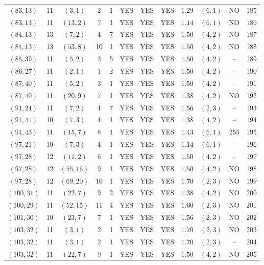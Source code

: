 \begin{longtable}{|c|c|c|c|c|c|c|c|c|c|c|c|}
$(83,13)$ & 11 & $(3,1)$ & 2 & 1 & YES & YES & YES & $1.29$ & $(6,1)$ & NO & 185\\
$(83,13)$ & 11 & $(13,2)$ & 7 & 1 & YES & YES & YES & $1.14$ & $(6,1)$ & NO & 186\\
$(84,13)$ & 13 & $(7,2)$ & 4 & 7 & YES & YES & YES & $1.50$ & $(4,2)$ & NO & 187\\
$(84,13)$ & 13 & $(53,8)$ & 10 & 1 & YES & YES & YES & $1.50$ & $(4,2)$ & NO & 188\\
$(85,39)$ & 11 & $(5,2)$ & 3 & 5 & YES & YES & YES & $1.50$ & $(4,2)$ & -- & 189\\
$(86,27)$ & 11 & $(2,1)$ & 1 & 2 & YES & YES & YES & $1.50$ & $(4,2)$ & -- & 190\\
$(87,40)$ & 11 & $(5,2)$ & 3 & 1 & YES & YES & YES & $1.50$ & $(4,2)$ & -- & 191\\
$(87,40)$ & 11 & $(20,9)$ & 7 & 1 & YES & YES & YES & $1.38$ & $(4,2)$ & NO & 192\\
$(91,24)$ & 11 & $(7,2)$ & 4 & 7 & YES & YES & YES & $1.56$ & $(2,3)$ & -- & 193\\
$(94,41)$ & 10 & $(7,3)$ & 4 & 1 & YES & YES & YES & $1.38$ & $(4,2)$ & -- & 194\\
$(94,43)$ & 11 & $(15,7)$ & 8 & 1 & YES & YES & YES & $1.43$ & $(6,1)$ & 255 & 195\\
$(97,21)$ & 10 & $(7,3)$ & 4 & 1 & YES & YES & YES & $1.14$ & $(6,1)$ & -- & 196\\
$(97,28)$ & 12 & $(11,2)$ & 6 & 1 & YES & YES & YES & $1.50$ & $(4,2)$ & -- & 197\\
$(97,28)$ & 12 & $(55,16)$ & 9 & 1 & YES & YES & YES & $1.50$ & $(4,2)$ & NO & 198\\
$(97,28)$ & 12 & $(69,20)$ & 10 & 1 & YES & YES & YES & $1.70$ & $(2,3)$ & NO & 199\\
$(100,31)$ & 11 & $(22,7)$ & 9 & 2 & YES & YES & YES & $1.38$ & $(4,2)$ & NO & 200\\
$(100,29)$ & 11 & $(52,15)$ & 11 & 4 & YES & YES & YES & $1.60$ & $(2,3)$ & NO & 201\\
$(101,30)$ & 10 & $(23,7)$ & 7 & 1 & YES & YES & YES & $1.56$ & $(2,3)$ & NO & 202\\
$(103,32)$ & 11 & $(3,1)$ & 2 & 1 & YES & YES & YES & $1.70$ & $(2,3)$ & NO & 203\\
$(103,32)$ & 11 & $(3,1)$ & 2 & 1 & YES & YES & YES & $1.70$ & $(2,3)$ & -- & 204\\
$(103,32)$ & 11 & $(22,7)$ & 9 & 1 & YES & YES & YES & $1.50$ & $(4,2)$ & NO & 205\\

\end{longtable}
